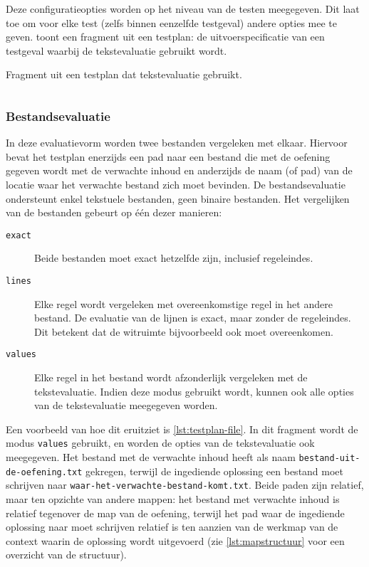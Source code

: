 Deze configuratieopties worden op het niveau van de testen meegegeven.
Dit laat toe om voor elke test (zelfs binnen eenzelfde testgeval) andere opties mee te geven.
 toont een fragment uit een testplan: de uitvoerspecificatie van een testgeval waarbij de tekstevaluatie gebruikt wordt.

\begin{listing}
    \caption{Fragment uit een testplan dat tekstevaluatie gebruikt.}
    \label{lst:testplan-text}
    \inputminted[breaklines]{json}{code/testplan-text.json}
\end{listing}

\subsubsection{Bestandsevaluatie}

In deze evaluatievorm worden twee bestanden vergeleken met elkaar.
Hiervoor bevat het testplan enerzijds een pad naar een bestand die met de oefening gegeven wordt met de verwachte inhoud en anderzijds de naam (of pad) van de locatie waar het verwachte bestand zich moet bevinden.
De bestandsevaluatie ondersteunt enkel tekstuele bestanden, geen binaire bestanden.
Het vergelijken van de bestanden gebeurt op één dezer manieren:

\begin{description}
    \item[\texttt{exact}] Beide bestanden moet exact hetzelfde zijn, inclusief regeleindes.
    \item[\texttt{lines}] Elke regel wordt vergeleken met overeenkomstige regel in het andere bestand.
    De evaluatie van de lijnen is exact, maar zonder de regeleindes.
    Dit betekent dat de witruimte bijvoorbeeld ook moet overeenkomen.
    \item[\texttt{values}] Elke regel in het bestand wordt afzonderlijk vergeleken met de tekstevaluatie.
    Indien deze modus gebruikt wordt, kunnen ook alle opties van de tekstevaluatie meegegeven worden.
\end{description}

Een voorbeeld van hoe dit eruitziet is \cref{lst:testplan-file}.
In dit fragment wordt de modus \texttt{values} gebruikt, en worden de opties van de tekstevaluatie ook meegegeven.
Het bestand met de verwachte inhoud heeft als naam \texttt{bestand-uit-de-oefening.txt} gekregen, terwijl de ingediende oplossing een bestand moet schrijven naar \texttt{waar-het-verwachte-bestand-komt.txt}.
Beide paden zijn relatief, maar ten opzichte van andere mappen: het bestand met verwachte inhoud is relatief tegenover de map van de oefening, terwijl het pad waar de ingediende oplossing naar moet schrijven relatief is ten aanzien van de werkmap van de context waarin de oplossing wordt uitgevoerd (zie \cref{lst:mapstructuur} voor een overzicht van de structuur).

